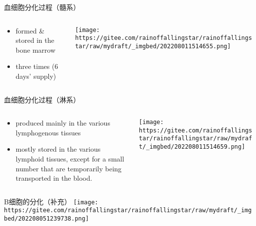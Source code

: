 \documentclass[
  ignorenonframetext,
]{beamer}
\begin{document}
\begin{frame}
\begin{block}{血细胞分化过程（髓系）}
\protect\hypertarget{ux8840ux7ec6ux80deux5206ux5316ux8fc7ux7a0bux9ad3ux7cfb}{}
\begin{columns}[T]
\begin{column}{0.3\textwidth}
\begin{itemize}
\item
  formed \& stored in the bone marrow
\item
  three times (6 days' supply)
\end{itemize}
\end{column}

\begin{column}{0.7\textwidth}
\texttt{[image: https://gitee.com/rainoffallingstar/rainoffallingstar/raw/mydraft/\_imgbed/202208011514655.png]}
\end{column}
\end{columns}
\end{block}
\end{frame}

\begin{frame}
\begin{block}{血细胞分化过程（淋系）}
\protect\hypertarget{ux8840ux7ec6ux80deux5206ux5316ux8fc7ux7a0bux6dcbux7cfb}{}
\begin{columns}[T]
\begin{column}{0.3\textwidth}
\begin{itemize}
\item
  produced mainly in the various lymphogenous tissues
\item
  mostly stored in the various lymphoid tissues, except for a small
  number that are temporarily being transported in the blood.
\end{itemize}
\end{column}

\begin{column}{0.7\textwidth}
\texttt{[image: https://gitee.com/rainoffallingstar/rainoffallingstar/raw/mydraft/\_imgbed/202208011514659.png]}
\end{column}
\end{columns}
\end{block}
\end{frame}

\begin{frame}
\begin{block}{B细胞的分化（补充）}
\protect\hypertarget{bux7ec6ux80deux7684ux5206ux5316ux8865ux5145}{}
\texttt{[image: https://gitee.com/rainoffallingstar/rainoffallingstar/raw/mydraft/\_imgbed/202208051239738.png]}
\end{block}
\end{frame}
\end{document}
